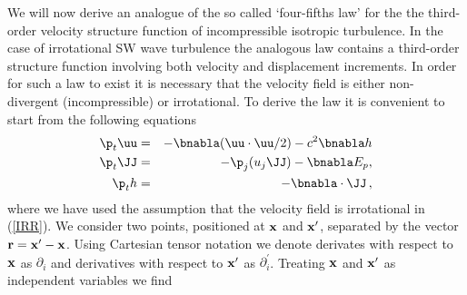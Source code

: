 We will now derive an analogue of the so called `four-fifths  law' \citep[]{Kolmogorov1941} for the the third-order velocity structure function of incompressible isotropic turbulence.   In the case of irrotational SW wave turbulence the analogous law contains a third-order structure function involving both velocity and displacement increments.  In order for such a law to exist it is necessary that the velocity field is either non-divergent (incompressible) or irrotational. To derive the law it is convenient to start from the following equations
\begin{eqnarray} \label{IRR}
\p_t \uu &=& -\bnabla  (\uu \cdot \uu /2) - c^2 \bnabla h  \\
\p_t \JJ &=& -\p_j (u_j \JJ) - \bnabla E_p,\\
\p_t h   &=& -\bnabla \cdot \JJ \, ,
\end{eqnarray}
where we have used the  assumption that the velocity field is irrotational in (\ref{IRR}). We consider two points, positioned at $ \bf x $ and $ {\bf x}^\prime $, separated by the vector $ {\bf r} = {\bf x}^\prime - {\bf x} $.
Using Cartesian tensor notation we denote derivates with respect to $ {\bf x} $ as $ \partial_i $ and derivatives with respect to $ {\bf x}^\prime $ as $ \partial^{\prime}_i $. Treating $ \bf x $ and $ {\bf x}^\prime $ as independent variables we find

